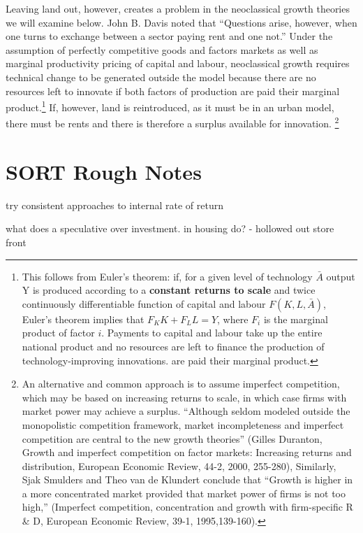 Leaving land out, however, creates a problem in  the neoclassical growth theories we will examine below. John B. Davis \cite{davisRicardoTheoryProfit1993} noted that ``Questions arise, however, when one turns to exchange between a sector paying rent and one not.'' 
Under the assumption of perfectly competitive goods and factors markets as well as marginal productivity pricing of capital and labour, neoclassical growth requires technical change to be generated outside the model because there are no resources left to innovate if both factors of production are paid their marginal product.\footnote{This follows from Euler's theorem: if, for a given level of technology $\bar A$ output Y is produced according to a \textbf{constant returns to scale} and twice continuously differentiable function of capital and labour $F(K, L, \bar A)$, Euler's theorem implies that $F_K K + F_L L=Y$, where $F_i$ is the marginal product of factor $i$. Payments to  capital and labour take up the entire national product and no resources are left to finance the production of technology-improving innovations. are paid their marginal product.} 
If, however, land is reintroduced, as it must be in an urban model, there must be rents and there is therefore a surplus available for innovation.
\footnote{An alternative and common approach is to assume imperfect competition, which may be based on increasing returns to scale, in which case firms with market power may achieve a surplus. ``Although seldom modeled outside the monopolistic competition framework, market incompleteness and imperfect competition are central to the new growth theories'' (Gilles Duranton, Growth and imperfect competition on factor markets: Increasing returns and distribution, European Economic Review, 44-2, 2000, 255-280), Similarly, Sjak Smulders and Theo van de Klundert conclude that ``Growth is higher in a more concentrated market provided that market power of firms is not too high,'' (Imperfect competition, concentration and growth with firm-specific R \& D, European Economic Review, 39-1, 1995,139-160).}



\section{SORT Rough Notes}

try consistent approaches to \gls{internal rate of return}


what does a speculative over investment.  in housing  do? - hollowed out store front


